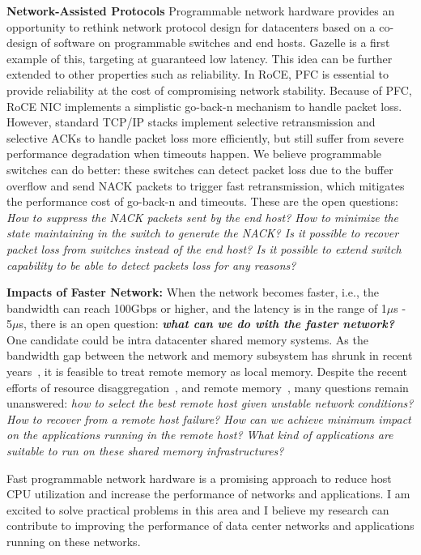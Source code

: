 \documentclass[10pt]{article}
\begin{document}
\textbf{Network-Assisted Protocols}
Programmable network hardware provides an opportunity to rethink network protocol design
for datacenters based on a co-design of software on programmable switches and end hosts.
Gazelle is a first example of this, targeting at guaranteed low latency.
This idea can be further extended to other properties such as reliability.
In RoCE, PFC is essential to provide reliability at the cost of compromising network stability. 
Because of PFC, RoCE NIC implements a simplistic go-back-n mechanism to handle packet loss.
However, standard TCP/IP stacks implement selective retransmission and selective ACKs to handle packet loss more efficiently, but still suffer from  severe performance degradation when timeouts happen.
We believe programmable switches can do better: these switches can detect packet loss due to the buffer overflow and send NACK packets to trigger fast retransmission, which mitigates the performance cost of go-back-n and timeouts.
These are the open questions: {\it How to suppress the NACK packets sent by the end host? How to minimize the state maintaining in the switch to generate the NACK? Is it possible to recover packet loss from switches instead of the end host? 
Is it possible to extend switch capability to be able to detect packets loss for any reasons? }  

\textbf{Impacts of Faster Network:}
When the network becomes faster, i.e., the bandwidth can reach 100Gbps or higher, and the latency is in the range of 1$\mu$s - 5$\mu$s, there is an open question: \textbf{\it what can we do with the faster network?} One candidate could be intra datacenter shared memory systems. As the bandwidth gap between the network and memory subsystem has shrunk in recent years~\cite{memory:Marcos}, it is feasible to treat remote memory as local memory. Despite the recent efforts of resource disaggregation~\cite{aggregation:gao}, and remote memory~\cite{memory:Marcos, Infiniswap}, 
many questions remain unanswered: {\it how to select the best remote host given unstable network conditions? How to recover from a remote host failure? How can we achieve minimum impact on the applications running in the remote host? What kind of applications are suitable to run on these shared memory infrastructures?}

Fast programmable network hardware is a promising approach to reduce host CPU utilization and increase the performance of networks and applications. I am excited to solve practical problems in this area and I believe my research can contribute to improving the performance of data center networks and applications running on these networks. 

%

\end{document}
